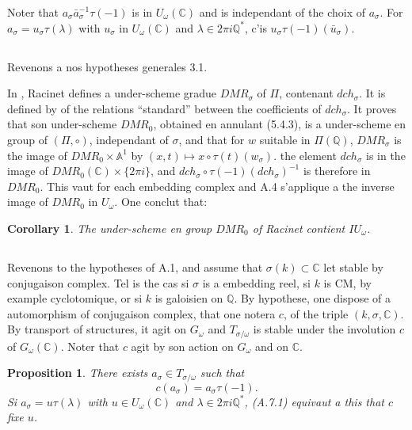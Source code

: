 \documentclass[11pt,a4paper]{article}
\theoremstyle{plain}
\newtheorem{proposition}[theorem]{Proposition}
\newtheorem{corollary}[theorem]{Corollary}
\theoremstyle{definition}
\newcommand{\DMR}{\mathit{DMR}}
\newcommand{\dch}{\mathit{dch}}
\newcommand{\Q}{\mathbb{Q}}
\newcommand{\C}{\mathbb{C}}
\newcommand{\A}{\mathbb{A}}
\begin{document}
Noter that $a_\sigma \bar{a}_\sigma^{-1} \tau(-1)$ is in $U_\omega(\C)$ and is independant of the choix of $a_\sigma$. For $a_\sigma = u_\sigma \tau(\lambda)$ with $u_\sigma$ in $U_\omega(\C)$ and $\lambda \in 2\pi i \Q^*$, c'is $u_\sigma \tau(-1)(\bar{u}_\sigma)$.

\subsection{}
Revenons a nos hypotheses generales 3.1.

In \cite{2}, Racinet defines a under-scheme gradue $\DMR_\sigma$ of $\Pi$, contenant $\dch_\sigma$. It is defined by of the relations ``standard'' between the coefficients of $\dch_\sigma$. It proves that son under-scheme $\DMR_0$, obtained en annulant (5.4.3), is a under-scheme en group of $(\Pi, \circ)$, independant of $\sigma$, and that for $w$ suitable in $\Pi(\Q)$, $\DMR_\sigma$ is the image of $\DMR_0 \times \A^1$ by $(x,t) \mapsto x \circ \tau(t)(w_\sigma)$. the element $\dch_\sigma$ is in the image of $\DMR_0(\C) \times \{2\pi i\}$, and $\dch_\sigma \circ \tau(-1)(\dch_\sigma)^{-1}$ is therefore in $\DMR_0$. This vaut for each embedding complex and A.4 s'applique a the inverse image of $\DMR_0$ in $U_\omega$. One conclut that:

\begin{corollary}\label{cor:A.5}
The under-scheme en group $\DMR_0$ of Racinet contient $IU_\omega$.
\end{corollary}

\subsection{}
Revenons to the hypotheses of A.1, and assume that $\sigma(k) \subset \C$ let stable by conjugaison complex. Tel is the cas si $\sigma$ is a embedding reel, si $k$ is CM, by example cyclotomique, or si $k$ is galoisien on $\Q$. By hypothese, one dispose of a automorphism of conjugaison complex, that one notera $c$, of the triple $(k, \sigma, \C)$. By transport of structures, it agit on $G_\omega$ and $T_{\sigma/\omega}$ is stable under the involution $c$ of $G_\omega(\C)$. Noter that $c$ agit by son action on $G_\omega$ and on $\C$.

\begin{proposition}\label{prop:A.7}
There exists $a_\sigma \in T_{\sigma/\omega}$ such that
\begin{equation}\label{eq:A.7.1}
c(a_\sigma) = a_\sigma \tau(-1).
\end{equation}
Si $a_\sigma = u \tau(\lambda)$ with $u \in U_\omega(\C)$ and $\lambda \in 2\pi i \Q^*$, (A.7.1) equivaut a this that $c$ fixe $u$.
\end{proposition}
\end{document}
